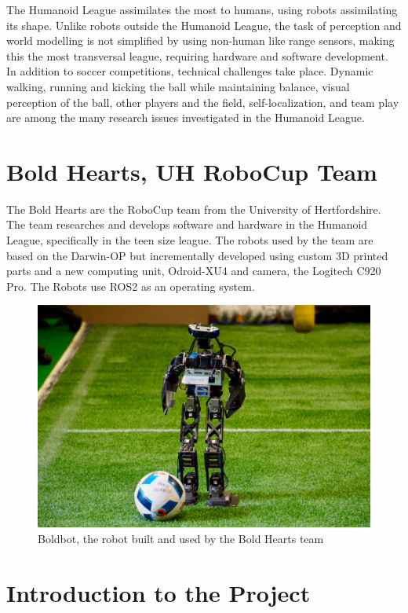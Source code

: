  The Humanoid League assimilates the most to humans, using robots assimilating its shape. Unlike robots outside the Humanoid League, the task of perception and world modelling is not simplified by using non-human like range sensors, making this the most transversal league, requiring hardware and software development. 
 In addition to soccer competitions, technical challenges take place. 
 Dynamic walking, running and kicking the ball while maintaining balance, visual perception of the ball, other players and the field, self-localization, and team play are among the many research issues investigated in the Humanoid League.

 \section{Bold Hearts, UH RoboCup Team}
 The Bold Hearts are the RoboCup team from the University of Hertfordshire. The team researches and develops software and hardware in the Humanoid League, specifically in the teen size league.
 The robots used by the team are based on the Darwin-OP but incrementally developed using custom 3D printed parts and a new computing unit, Odroid-XU4 and camera, the Logitech C920 Pro. 
 The Robots use ROS2 as an operating system.
 \cite{boldhearts}
 \begin{figure}[H]
 \centering
 \includegraphics[scale=0.26]{figures/boldbot_2.png}
 \caption{Boldbot, the robot built and used by the Bold Hearts team}
 \end{figure}

 \section{Introduction to the Project}


